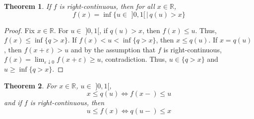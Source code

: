 \documentclass[11pt, a4paper, openany]{book}
\newtheorem{thm}{Theorem}\newtheorem{lem}{Lemma}\newtheorem{crl}{Corollary}
\theoremstyle{definition}
\begin{document}
    \begin{thm}\label{duality of quantile functions and c.d.f.s}
        If $f$ is right-continuous, then for all $x\in\mathbb{R}$,
        \[
            f(x)=\inf{\{u\in\,\,]0,1[\,|\,q(u)>x\}}
        \]
    \end{thm}
    \begin{proof}
        Fix $x\in\mathbb{R}$. For $u\in \,\,]0,1[$, if $q(u)>x$, then $f(x)\leqslant u$. Thus, $f(x)\leqslant \inf{\{q>x\}}$. If $f(x)<u<\inf{\{q>x\}}$, then $x\leqslant q(u)$. If $x=q(u)$, then $f(x+\varepsilon)>u$ and by the assumption that $f$ is right-continuous, $f(x)=\lim_{\varepsilon\downarrow0}f(x+\varepsilon)\geqslant u$, contradiction. Thus, $u\in \{q>x\}$ and $u\geqslant \inf{\{q>x\}}$.
    \end{proof}
    \begin{thm}
        For $x\in\mathbb{R}$, $u\in \,\,]0,1[$,
        \[
            x\leqslant q(u)\Longleftrightarrow f(x-)\leqslant u
        \]
        and if $f$ is right-continuous, then
        \[
            u\leqslant f(x)\Longleftrightarrow q(u-)\leqslant x
        \]
    \end{thm}
\end{document}
